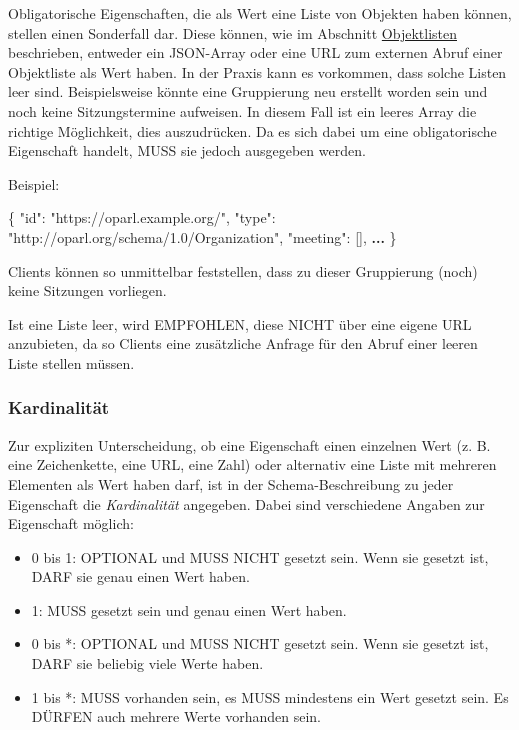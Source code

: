 \documentclass[,a4paper]{article}
\newenvironment{Shaded}{}{}
\newcommand{\DataTypeTok}[1]{\textcolor[rgb]{0.56,0.13,0.00}{{#1}}}
\newcommand{\StringTok}[1]{\textcolor[rgb]{0.25,0.44,0.63}{{#1}}}
\newcommand{\OtherTok}[1]{\textcolor[rgb]{0.00,0.44,0.13}{{#1}}}
\newcommand{\FunctionTok}[1]{\textcolor[rgb]{0.02,0.16,0.49}{{#1}}}
\newcommand{\ErrorTok}[1]{\textcolor[rgb]{1.00,0.00,0.00}{\textbf{{#1}}}}
\begin{document}
Obligatorische Eigenschaften, die als Wert eine Liste von Objekten haben
können, stellen einen Sonderfall dar. Diese können, wie im Abschnitt
\hyperref[objektlisten]{Objektlisten} beschrieben, entweder ein
JSON-Array oder eine URL zum externen Abruf einer Objektliste als Wert
haben. In der Praxis kann es vorkommen, dass solche Listen leer sind.
Beispielsweise könnte eine Gruppierung neu erstellt worden sein und noch
keine Sitzungstermine aufweisen. In diesem Fall ist ein leeres Array die
richtige Möglichkeit, dies auszudrücken. Da es sich dabei um eine
obligatorische Eigenschaft handelt, MUSS sie jedoch ausgegeben werden.

Beispiel:

\begin{Shaded}
\begin{Highlighting}[]
\FunctionTok{\{}
    \DataTypeTok{"id"}\FunctionTok{:} \StringTok{"https://oparl.example.org/"}\FunctionTok{,}
    \DataTypeTok{"type"}\FunctionTok{:} \StringTok{"http://oparl.org/schema/1.0/Organization"}\FunctionTok{,}
    \DataTypeTok{"meeting"}\FunctionTok{:} \OtherTok{[]}\FunctionTok{,}
    \ErrorTok{...}
\FunctionTok{\}}
\end{Highlighting}
\end{Shaded}

Clients können so unmittelbar feststellen, dass zu dieser Gruppierung
(noch) keine Sitzungen vorliegen.

Ist eine Liste leer, wird EMPFOHLEN, diese NICHT über eine eigene URL
anzubieten, da so Clients eine zusätzliche Anfrage für den Abruf einer
leeren Liste stellen müssen.

\subsubsection{Kardinalität}\label{kardinalituxe4t}

Zur expliziten Unterscheidung, ob eine Eigenschaft einen einzelnen Wert
(z. B. eine Zeichenkette, eine URL, eine Zahl) oder alternativ eine
Liste mit mehreren Elementen als Wert haben darf, ist in der
Schema-Beschreibung zu jeder Eigenschaft die \emph{Kardinalität}
angegeben. Dabei sind verschiedene Angaben zur Eigenschaft möglich:

\begin{itemize}
\item
  0 bis 1: OPTIONAL und MUSS NICHT gesetzt sein. Wenn sie gesetzt ist,
  DARF sie genau einen Wert haben.
\item
  1: MUSS gesetzt sein und genau einen Wert haben.
\item
  0 bis *: OPTIONAL und MUSS NICHT gesetzt sein. Wenn sie gesetzt ist,
  DARF sie beliebig viele Werte haben.
\item
  1 bis *: MUSS vorhanden sein, es MUSS mindestens ein Wert gesetzt
  sein. Es DÜRFEN auch mehrere Werte vorhanden sein.
\end{itemize}
\end{document}
